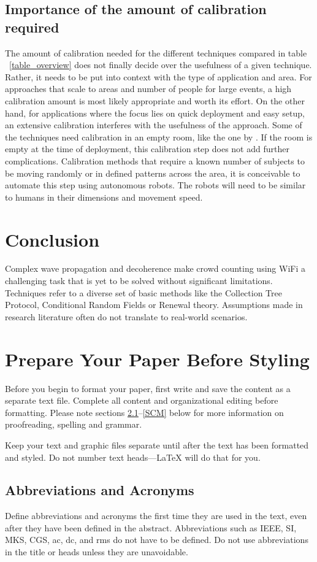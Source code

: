 \documentclass[conference]{IEEEtran}
\begin{document}
\subsection{Importance of the amount of calibration required}
The amount of calibration needed for the different techniques compared in table ~\ref{table_overview} does not finally decide over the usefulness of a given technique. Rather, it needs to be put into context with the type of application and area. For approaches that scale to areas and number of people for large events, a high calibration amount is most likely appropriate and worth its effort. On the other hand, for applications where the focus lies on quick deployment and easy setup, an extensive calibration interferes with the usefulness of the approach. Some of the techniques need calibration in an empty room, like the one by \cite{Xu}. If the room is empty at the time of deployment, this calibration step does not add further complications. Calibration methods that require a known number of subjects to be moving randomly or in defined patterns across the area, it is conceivable to automate this step using autonomous robots. The robots will need to be similar to humans in their dimensions and movement speed.

\section{Conclusion}
Complex wave propagation and decoherence make crowd counting using WiFi a challenging task that is yet to be solved without significant limitations. Techniques refer to a diverse set of basic methods like the Collection Tree Protocol, Conditional Random Fields or Renewal theory. Assumptions made in research literature often do not translate to real-world scenarios.

\section{Prepare Your Paper Before Styling}
Before you begin to format your paper, first write and save the content as a 
separate text file. Complete all content and organizational editing before 
formatting. Please note sections \ref{AA}--\ref{SCM} below for more information on 
proofreading, spelling and grammar.

Keep your text and graphic files separate until after the text has been 
formatted and styled. Do not number text heads---{\LaTeX} will do that 
for you.

\subsection{Abbreviations and Acronyms}\label{AA}
Define abbreviations and acronyms the first time they are used in the text, 
even after they have been defined in the abstract. Abbreviations such as 
IEEE, SI, MKS, CGS, ac, dc, and rms do not have to be defined. Do not use 
abbreviations in the title or heads unless they are unavoidable.
\end{document}
